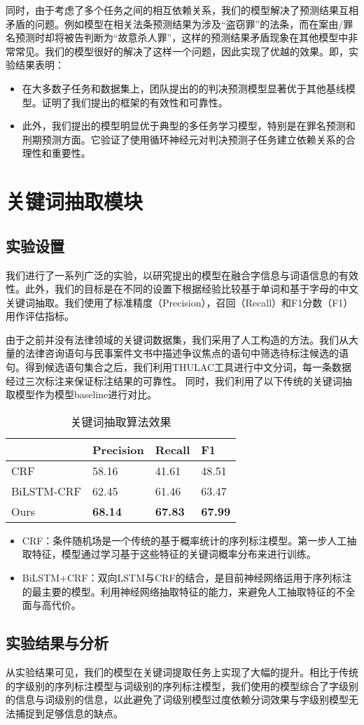 同时，由于考虑了多个任务之间的相互依赖关系，我们的模型解决了预测结果互相矛盾的问题。例如模型在相关法条预测结果为涉及“盗窃罪”的法条，而在案由/罪名预测时却将被告判断为“故意杀人罪”，这样的预测结果矛盾现象在其他模型中非常常见。我们的模型很好的解决了这样一个问题，因此实现了优越的效果。即，实验结果表明：
\begin{itemize}
	\item 在大多数子任务和数据集上，团队提出的的判决预测模型显著优于其他基线模型。证明了我们提出的框架的有效性和可靠性。
	\item 此外，我们提出的模型明显优于典型的多任务学习模型，特别是在罪名预测和刑期预测方面。它验证了使用循环神经元对判决预测子任务建立依赖关系的合理性和重要性。
\end{itemize}


\section{关键词抽取模块}
\subsection{实验设置}
我们进行了一系列广泛的实验，以研究提出的模型在融合字信息与词语信息的有效性。此外，我们的目标是在不同的设置下根据经验比较基于单词和基于字母的中文关键词抽取。我们使用了标准精度（Precision），召回（Recall）和F1分数（F1）用作评估指标。

由于之前并没有法律领域的关键词数据集，我们采用了人工构造的方法。我们从大量的法律咨询语句与民事案件文书中描述争议焦点的语句中筛选待标注候选的语句。得到候选语句集合之后，我们利用THULAC工具进行中文分词，每一条数据经过三次标注来保证标注结果的可靠性。
同时，我们利用了以下传统的关键词抽取模型作为模型baseline进行对比。
\begin{table}[ht]
\centering
\begin{tabular}{llll}
\hline
       & Precision  & Recall & F1    \\ \hline
CRF        & 58.16  & 41.61 & 48.51 \\
BiLSTM-CRF & 62.45  & 61.46 & 63.47 \\ \hline
Ours       & \textbf{68.14}  & \textbf{67.83} & \textbf{67.99} \\ \hline
\end{tabular}
\caption{关键词抽取算法效果}
\end{table}

\begin{itemize}
	\item CRF：条件随机场是一个传统的基于概率统计的序列标注模型。第一步人工抽取特征，模型通过学习基于这些特征的关键词概率分布来进行训练。
	\item BiLSTM+CRF：双向LSTM与CRF的结合，是目前神经网络运用于序列标注的最主要的模型。利用神经网络抽取特征的能力，来避免人工抽取特征的不全面与高代价。
\end{itemize}

\subsection{实验结果与分析}

从实验结果可见，我们的模型在关键词提取任务上实现了大幅的提升。相比于传统的字级别的序列标注模型与词级别的序列标注模型，我们使用的模型综合了字级别的信息与词级别的信息，以此避免了词级别模型过度依赖分词效果与字级别模型无法捕捉到足够信息的缺点。



